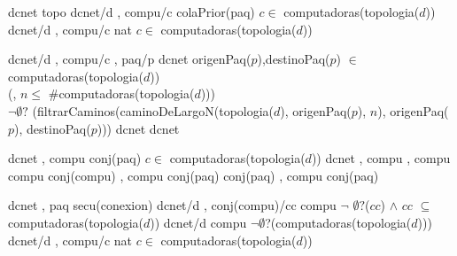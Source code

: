 \begin{tad}{}


\tadObservadores
	 {dcnet} {topo} {}
	 {dcnet/d , compu/c} {colaPrior(paq)} {$c\in$ computadoras(topologia($d$))}
	 {dcnet/d , compu/c} {nat} {$c\in$ computadoras(topologia($d$))} 

\tadGeneradores
	 {dcnet/d , compu/c , paq/p} {dcnet} {origenPaq($p$),destinoPaq($p$)
																	  $\in$ computadoras(topologia($d$)) \yluego\\
																	 (, $n \leq$ \#computadoras(topologia($d$)))\\
																	  $\neg\emptyset?$
																(filtrarCaminos(caminoDeLargoN(topologia($d$), origenPaq($p$), $n$), origenPaq($p$), destinoPaq($p$)))}
	 {dcnet} {dcnet} {}

\tadOtrasOperaciones
	 {dcnet , compu} {conj(paq)} {$c\in$ computadoras(topologia($d$))}
	 {dcnet , compu , compu} {compu} {}
	 {conj(compu) , compu} {conj(paq)} {}
	 {conj(paq) , compu} {conj(paq)} {}
	
	 {dcnet , paq} {secu(conexion)} {}
	 {dcnet/d , conj(compu)/cc} {compu} {$\neg$ $\emptyset?$($cc$) $\wedge$ 
																	$cc$ $\subseteq$ computadoras(topologia($d$))}	
	 {dcnet/d} {compu} {$\neg\emptyset$?(computadoras(topologia($d$)))}   
	 {dcnet/d , compu/c} {nat}	{$c\in$ computadoras(topologia($d$))}							  



\end{tad}
